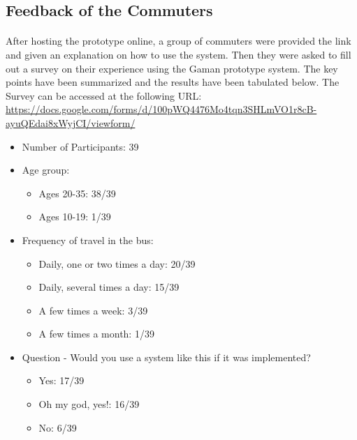 \documentclass[12pt, oneside]{report}
\begin{document}
\subsection{Feedback of the Commuters}

\paragraph{} After hosting the prototype online, a group of commuters were provided the link and given an explanation on how to use the system. Then they were asked to fill out a survey on their experience using the Gaman prototype system. The key points have been summarized and the results have been tabulated below. The Survey can be accessed at the following URL: \url{https://docs.google.com/forms/d/100pWQ4476Mo4tqn3SHLmVO1r8cB-ayuQEdai8xWyjCI/viewform/}

\begin {itemize}

\item Number of Participants: 39
\item Age group:
\begin {itemize}
\item Ages 20-35: 38/39
\item Ages 10-19: 1/39
\end {itemize}

\item Frequency of travel in the bus:

\begin {itemize}
\item Daily, one or two times a day: 20/39
\item Daily, several times a day: 15/39
\item A few times a week: 3/39
\item A few times a month: 1/39
\end {itemize}

\item Question - Would you use a system like this if it was implemented?
\begin {itemize}
\item Yes: 17/39
\item Oh my god, yes!: 16/39
\item No: 6/39
\end {itemize}

\end {itemize}


\newpage

\end{document}
